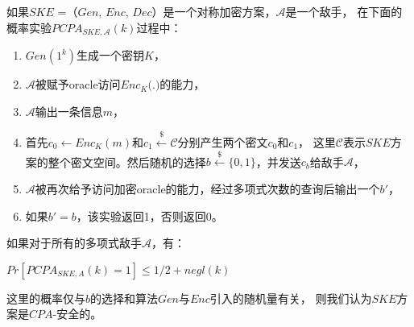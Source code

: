 \begin{defn}
\label{defn:pcpa_security}
如果$SKE$ =（$Gen$, $Enc$, $Dec$）是一个对称加密方案，$\mathcal{A}$是一个敌手，
在下面的概率实验$PCPA_{SKE,\mathcal{A}}(k)$过程中：
\begin{enumerate}
  \item $Gen(1^k )$生成一个密钥$K$，
	
  \item $\mathcal{A}$被赋予oracle访问$Enc_K($.$)$的能力，
	
  \item $\mathcal{A}$输出一条信息$m$，
	
  \item 首先$c_0 \leftarrow Enc_K(m)$和$c_1 \overset{\$} \leftarrow \mathcal{C}$分别产生两个密文$c_0$和$c_1$，
  这里$\mathcal{C}$表示$SKE$方案的整个密文空间。然后随机的选择$b \overset{\$}\leftarrow \{0,1\}$，并发送$c_b$给敌手$\mathcal{A}$，
	
  \item $\mathcal{A}$被再次给予访问加密oracle的能力，经过多项式次数的查询后输出一个$b'$，
	
  \item 如果$b'=b$，该实验返回1，否则返回0。

  \end{enumerate}

  如果对于所有的多项式敌手$\mathcal{A}$，有：
  \begin{center}
  $Pr[PCPA_{SKE,A}(k)=1] \leq 1/2 + negl(k)$
  \end{center}
  这里的概率仅与$b$的选择和算法$Gen$与$Enc$引入的随机量有关，
  则我们认为$SKE$方案是$CPA$-安全的。
\end{defn}


